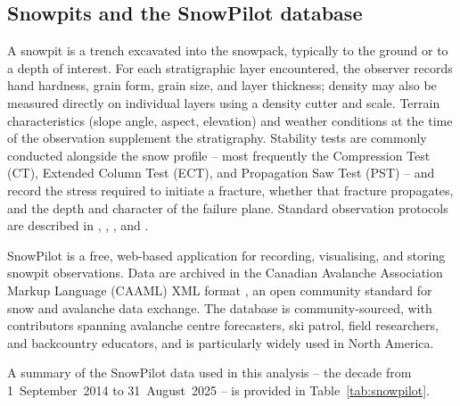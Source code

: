 \documentclass[hess, manuscript]{copernicus}
\begin{document}
\subsection{Snowpits and the SnowPilot database}
\label{sec:snowpilot_database}


A snowpit is a trench excavated into the snowpack, typically to the ground or to a depth of interest. For each stratigraphic layer encountered, the observer records hand hardness, grain form, grain size, and layer thickness; density may also be measured directly on individual layers using a density cutter and scale. Terrain characteristics (slope angle, aspect, elevation) and weather conditions at the time of the observation supplement the stratigraphy. Stability tests are commonly conducted alongside the snow profile -- most frequently the Compression Test (CT), Extended Column Test (ECT), and Propagation Saw Test (PST) -- and record the stress required to initiate a fracture, whether that fracture propagates, and the depth and character of the failure plane. Standard observation protocols are described in \citet{fierz2009}, \citet{greene2022}, \citet{caatechnicalcommittee2024}, and \citet{norwegianwaterresourcesandenergydirectorate2022}.


SnowPilot \citep{chabot2004,chabot2016} is a free, web-based application for recording, visualising, and storing snowpit observations. Data are archived in the Canadian Avalanche Association Markup Language (CAAML) XML format \citep{caatechnicalcommittee2024}, an open community standard for snow and avalanche data exchange. The database is community-sourced, with contributors spanning avalanche centre forecasters, ski patrol, field researchers, and backcountry educators, and is particularly widely used in North America.


A summary of the SnowPilot data used in this analysis -- the decade from 1~September~2014 to 31~August~2025 -- is provided in Table~\ref{tab:snowpilot}.
\end{document}
